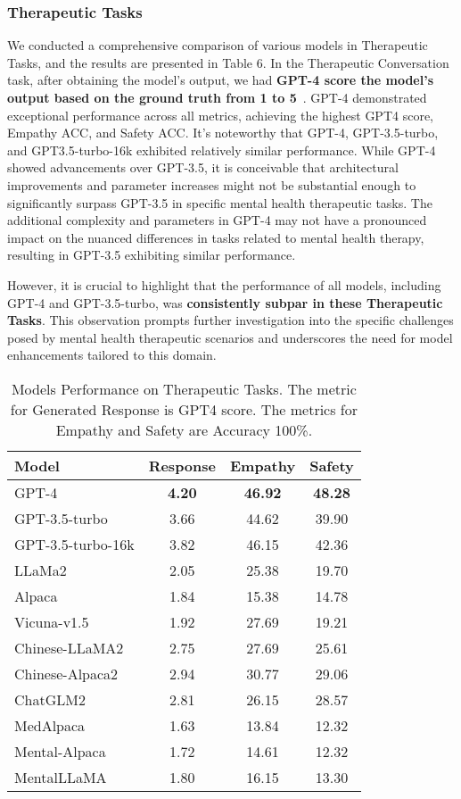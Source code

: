 \subsubsection{Therapeutic Tasks}We conducted a comprehensive comparison of various models in Therapeutic Tasks, and the results are presented in Table 6. In the Therapeutic Conversation task, after obtaining the model's output, we had \textbf{GPT-4 score the model's output based on the ground truth from 1 to 5}~\cite{liu2023geval}. GPT-4 demonstrated exceptional performance across all metrics, achieving the highest GPT4 score, Empathy ACC, and Safety ACC. 
It's noteworthy that GPT-4, GPT-3.5-turbo, and GPT3.5-turbo-16k exhibited relatively similar performance. While GPT-4 showed advancements over GPT-3.5, it is conceivable that architectural improvements and parameter increases might not be substantial enough to significantly surpass GPT-3.5 in specific mental health therapeutic tasks. The additional complexity and parameters in GPT-4 may not have a pronounced impact on the nuanced differences in tasks related to mental health therapy, resulting in GPT-3.5 exhibiting similar performance. 

However, it is crucial to highlight that the performance of all models, including GPT-4 and GPT-3.5-turbo, was \textbf{consistently subpar in these Therapeutic Tasks}. This observation prompts further investigation into the specific challenges posed by mental health therapeutic scenarios and underscores the need for model enhancements tailored to this domain. 


\begin{table}
\centering
\footnotesize
\begin{tabular}{l c c c}
\hline
\textbf{Model} & \textbf{Response} & \textbf{Empathy} & \textbf{Safety}\\
\hline
GPT-4 & \textbf{4.20} & \textbf{46.92} & \textbf{48.28}\\
GPT-3.5-turbo & 3.66 & 44.62 & 39.90\\
GPT-3.5-turbo-16k & 3.82 & 46.15 & 42.36\\
\hline
LLaMa2 & 2.05 & 25.38 & 19.70\\
Alpaca & 1.84 & 15.38 & 14.78\\
Vicuna-v1.5 & 1.92 & 27.69 & 19.21\\
\hline
Chinese-LLaMA2 & 2.75 & 27.69 & 25.61\\
Chinese-Alpaca2 & 2.94 & 30.77 & 29.06\\
ChatGLM2 & 2.81 & 26.15 & 28.57\\
\hline
MedAlpaca & 1.63 & 13.84 & 12.32\\
Mental-Alpaca & 1.72 & 14.61 & 12.32\\
MentalLLaMA & 1.80 & 16.15 & 13.30\\
\hline
\end{tabular}
\caption{Models Performance on Therapeutic Tasks. The metric for Generated Response is GPT4 score. The metrics for Empathy and Safety are Accuracy 100\%.}
\end{table}